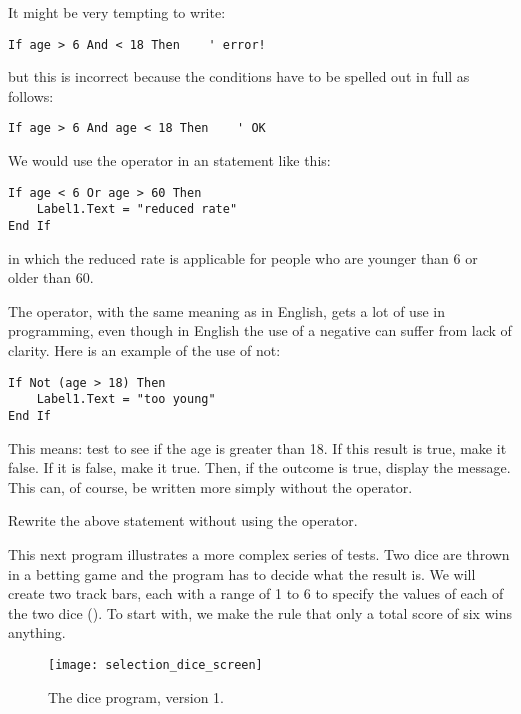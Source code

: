 		It might be very tempting to write:
		\begin{lstlisting}
If age > 6 And < 18 Then    ' error!
		\end{lstlisting}
		but this is incorrect because the conditions have to be spelled out in full as follows:
		\begin{lstlisting}
If age > 6 And age < 18 Then    ' OK
		\end{lstlisting}
		We would use the  operator in an  statement like this:
		\begin{lstlisting}
If age < 6 Or age > 60 Then
	Label1.Text = "reduced rate"
End If
		\end{lstlisting}
		in which the reduced rate is applicable for people who are younger than 6 or older than 60.

		The  operator, with the same meaning as in English, gets a lot of use in programming, even though in English the use of a negative can suffer from lack of clarity. Here is an example of the use of not:
		\begin{lstlisting}
If Not (age > 18) Then
	Label1.Text = "too young"
End If
		\end{lstlisting}
		This means: test to see if the age is greater than 18. If this result is true, make it false. If it is false, make it true. Then, if the outcome is true, display the message. This can, of course, be written more simply without the  operator.


		\begin{stqb}
			\begin{STQ}
				\item	Rewrite the above  statement without using the  operator.
			\end{STQ}
		\end{stqb}

		This next program illustrates a more complex series of tests. Two dice are thrown in a betting game and the program has to decide what the result is. We will create two track bars, each with a range of 1 to 6 to specify the values of each of the two dice (). To start with, we make the rule that only a total score of six wins anything.

		\begin{figure}[th]
			\centering
			\texttt{[image: selection\_dice\_screen]}
			\caption{The dice program, version 1.}
			\label{fig:selection_dice_screen}
		\end{figure}

